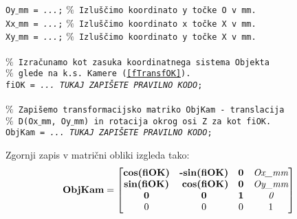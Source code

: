 \begin{enumerate}
\texttt{Oy$\_$mm = \emph{...};} \hspace{0.6cm} \textcolor[rgb]{0.50,0.50,0.50}{\texttt{$\%$ Izluščimo koordinato y točke O v mm.}} \\%
\texttt{Xx$\_$mm = \emph{...};} \hspace{0.6cm} \textcolor[rgb]{0.50,0.50,0.50}{\texttt{$\%$ Izluščimo koordinato x točke X v mm.}} \\%
\texttt{Xy$\_$mm = \emph{...};} \hspace{0.6cm} \textcolor[rgb]{0.50,0.50,0.50}{\texttt{$\%$ Izluščimo koordinato y točke X v mm.}} \\%
\\
\textcolor[rgb]{0.50,0.50,0.50}{\texttt{$\%$ Izračunamo kot zasuka koordinatnega sistema Objekta}} \\%
\textcolor[rgb]{0.50,0.50,0.50}{\texttt{$\%$ glede na k.s. Kamere (\ref{fTransfOK}).}} \\%
\texttt{fiOK = \emph{... TUKAJ ZAPIŠETE PRAVILNO KODO};} \\ %
\\
\textcolor[rgb]{0.50,0.50,0.50}{\texttt{$\%$ Zapišemo transformacijsko matriko ObjKam - translacija}} \\%
\textcolor[rgb]{0.50,0.50,0.50}{\texttt{$\%$ D(Ox$\_$mm, Oy$\_$mm) in rotacija okrog osi Z za kot fiOK.}} \\%
\texttt{ObjKam = \emph{... TUKAJ ZAPIŠETE PRAVILNO KODO};} \\ %
\end{enumerate}
\normalsize %
Zgornji zapis v matrični obliki izgleda tako:
\\
\begin{equation}
    \textbf{ObjKam} =
    \begin{bmatrix}
        \textbf{cos(fiOK)}  &   \textbf{-sin(fiOK)}   &    \textbf{0}  &   \emph{Ox$\_$mm}    \\%
        \textbf{sin(fiOK)}  &   \hspace{0.1cm} \textbf{cos(fiOK)}   &    \textbf{0}  &   \emph{Oy$\_$mm}    \\%
        \textbf{0}              &   \textbf{0}                &    \textbf{1}  &   \emph{0}    \\%
        0              &   0                &    0  &   1     \\%
    \end{bmatrix}
    \label{eObjKam}
\end{equation}

